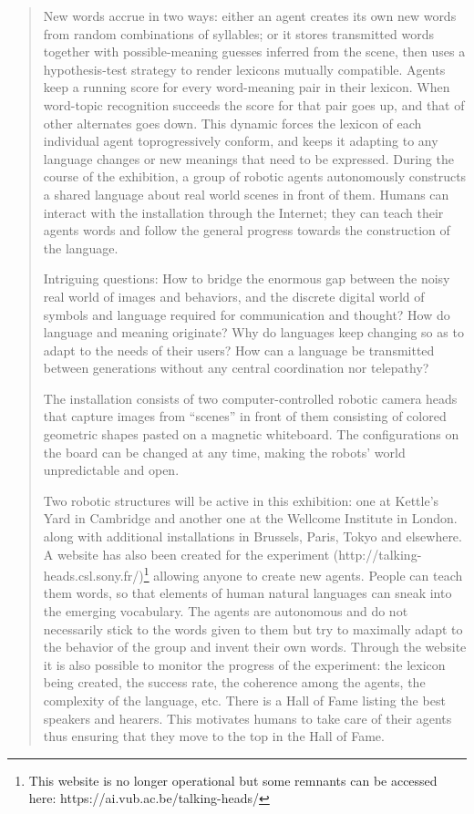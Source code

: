 \begin{quotation}
New words accrue in two ways: either an agent creates its own new words from random combinations of syllables; or it stores transmitted words together with possible-meaning guesses inferred from the scene, then uses a hypothesis-test strategy to render lexicons mutually compatible. Agents keep a running score for every word-meaning pair in their lexicon. When word-topic recognition succeeds the score for that pair goes up, and that of other alternates goes down. This dynamic forces the lexicon of each individual agent toprogressively conform, and keeps it adapting to any language changes or new meanings that need to be expressed. During the course of the exhibition, a group of robotic agents autonomously constructs a shared language about real world scenes in front of them. Humans can interact with the installation through the Internet; they can teach their agents words and follow the general progress towards the construction of the language.

Intriguing questions: How to bridge the enormous gap between the noisy real world of images and behaviors, and the discrete digital world of symbols and language required for communication and thought? How do language and meaning originate? Why do languages keep changing so as to adapt to the needs of their users? How can a language be transmitted between generations without any central coordination nor telepathy?

The installation consists of two computer-controlled robotic camera heads that capture images from ``scenes'' in front of them consisting of colored geometric shapes pasted on a magnetic whiteboard. The configurations on the board can be changed at any time, making the robots' world unpredictable and open.

Two robotic structures will be active in this exhibition: one at Kettle's Yard in Cambridge and another one at the Wellcome Institute in London. along with additional installations in Brussels, Paris, Tokyo and elsewhere. A website has also been created for the experiment (http://talking-heads.csl.sony.fr/)\footnote{This website is no longer operational but some remnants can be accessed here: 
https://ai.vub.ac.be/talking-heads/} 
allowing anyone to create new agents. People can teach them words, so that elements of human natural languages can sneak into the emerging vocabulary. The agents are autonomous and do not necessarily stick to the words given to them but try to maximally adapt to the behavior of the group and invent their own words. Through the website it is also possible to monitor the progress of the experiment: the lexicon being created, the success rate, the coherence among the agents, the complexity of the language, etc. There is a Hall of Fame listing the best speakers and hearers. This motivates humans to take care of their agents thus ensuring that they move to the top in the Hall of Fame.


\end{quotation}
